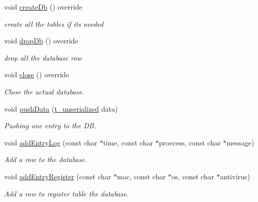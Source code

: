 \begin{DoxyCompactItemize}
void \hyperlink{classspider_1_1_sqlite_a8f553c8250b53adb7839e1dd3e91398c}{create\+Db} () override
\begin{DoxyCompactList}\small\item\em create all the tables if it\textquotesingle{}s needed \end{DoxyCompactList}\item 
\mbox{\label{classspider_1_1_sqlite_a303936190c7df910ba2418f66f407c79}} 
void \hyperlink{classspider_1_1_sqlite_a303936190c7df910ba2418f66f407c79}{drop\+Db} () override
\begin{DoxyCompactList}\small\item\em drop all the database row \end{DoxyCompactList}\item 
\mbox{\label{classspider_1_1_sqlite_ac47e8e734196589594e95543cc7cd697}} 
void \hyperlink{classspider_1_1_sqlite_ac47e8e734196589594e95543cc7cd697}{close} () override
\begin{DoxyCompactList}\small\item\em Close the actual database. \end{DoxyCompactList}\item 
void \hyperlink{classspider_1_1_sqlite_ac46531bba41f8e59c873f179cf10c9a0}{push\+Data} (\hyperlink{structt__unserialized}{t\+\_\+unserialized} data)
\begin{DoxyCompactList}\small\item\em Pushing one entry to the DB. \end{DoxyCompactList}\item 
void \hyperlink{classspider_1_1_sqlite_ae8ebd53fa6e30b8c8cfb463cc4e28cb8}{add\+Entry\+Log} (const char $\ast$time, const char $\ast$proccess, const char $\ast$message)
\begin{DoxyCompactList}\small\item\em Add a row to the database. \end{DoxyCompactList}\item 
void \hyperlink{classspider_1_1_sqlite_a6d39d5036a110745b1a3dee62dc96646}{add\+Entry\+Register} (const char $\ast$mac, const char $\ast$os, const char $\ast$antivirus)
\begin{DoxyCompactList}\small\item\em Add a row to register table the database. \end{DoxyCompactList}\item 

\end{DoxyCompactItemize}
